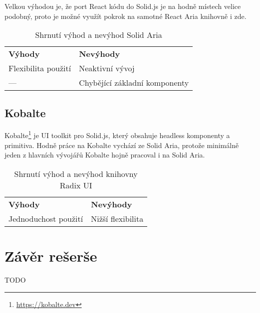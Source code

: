 Velkou výhodou je, že port React kódu do Solid.js je na hodně místech velice podobný, proto je možné využít pokrok na samotné React Aria knihovně i zde.

\begin{table}[ht]
    \begin{ctucolortab}
        \begin{tabularx}{\textwidth}{Y Y}
            \bfseries \textcolor{OK}{Výhody} & \bfseries \textcolor{NOT_OK}{Nevýhody} \\\Midrule{}
            Flexibilita použití              & Neaktivní vývoj                        \\
            ---                              & Chybějící základní komponenty
        \end{tabularx}
    \end{ctucolortab}
    \caption{Shrnutí výhod a nevýhod Solid Aria}
\end{table}

\subsection{Kobalte}

Kobalte\footnote{\url{https://kobalte.dev}} je UI toolkit pro Solid.js, který obsahuje headless komponenty a primitiva.
Hodně práce na Kobalte vychází ze Solid Aria, protože minimálně jeden z hlavních vývojářů Kobalte hojně pracoval i na Solid Aria.

\begin{table}[ht]
    \begin{ctucolortab}
        \begin{tabularx}{\textwidth}{Y Y}
            \bfseries \textcolor{OK}{Výhody} & \bfseries \textcolor{NOT_OK}{Nevýhody} \\\Midrule{}
            Jednoduchost použití             & Nižší flexibilita
        \end{tabularx}
    \end{ctucolortab}
    \caption{Shrnutí výhod a nevýhod knihovny Radix UI}
\end{table}

\section{Závěr rešerše}

TODO
